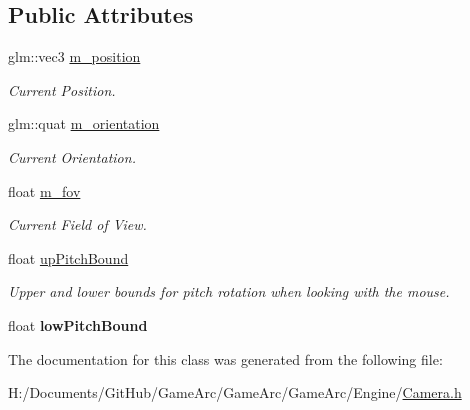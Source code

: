 \subsection*{Public Attributes}
\begin{DoxyCompactItemize}
\item 
\hypertarget{class_camera_aa4d06d49524248f81823444fa2544da0}{glm\+::vec3 \hyperlink{class_camera_aa4d06d49524248f81823444fa2544da0}{m\+\_\+position}}\label{class_camera_aa4d06d49524248f81823444fa2544da0}

\begin{DoxyCompactList}\small\item\em Current Position. \end{DoxyCompactList}\item 
\hypertarget{class_camera_ac035d6cb4b4bae255d6d12f51137357e}{glm\+::quat \hyperlink{class_camera_ac035d6cb4b4bae255d6d12f51137357e}{m\+\_\+orientation}}\label{class_camera_ac035d6cb4b4bae255d6d12f51137357e}

\begin{DoxyCompactList}\small\item\em Current Orientation. \end{DoxyCompactList}\item 
\hypertarget{class_camera_aa404a4e057fa16fb82ce8668d7a661b6}{float \hyperlink{class_camera_aa404a4e057fa16fb82ce8668d7a661b6}{m\+\_\+fov}}\label{class_camera_aa404a4e057fa16fb82ce8668d7a661b6}

\begin{DoxyCompactList}\small\item\em Current Field of View. \end{DoxyCompactList}\item 
\hypertarget{class_camera_a69da26cc38f7993b2605a8dd982aa0e4}{float \hyperlink{class_camera_a69da26cc38f7993b2605a8dd982aa0e4}{up\+Pitch\+Bound}}\label{class_camera_a69da26cc38f7993b2605a8dd982aa0e4}

\begin{DoxyCompactList}\small\item\em Upper and lower bounds for pitch rotation when looking with the mouse. \end{DoxyCompactList}\item 
\hypertarget{class_camera_a4f24e2b996dbf59fe1e2e51427dc49d3}{float {\bfseries low\+Pitch\+Bound}}\label{class_camera_a4f24e2b996dbf59fe1e2e51427dc49d3}

\end{DoxyCompactItemize}


The documentation for this class was generated from the following file\+:\begin{DoxyCompactItemize}
\item 
H\+:/\+Documents/\+Git\+Hub/\+Game\+Arc/\+Game\+Arc/\+Game\+Arc/\+Engine/\hyperlink{_camera_8h}{Camera.\+h}\end{DoxyCompactItemize}
